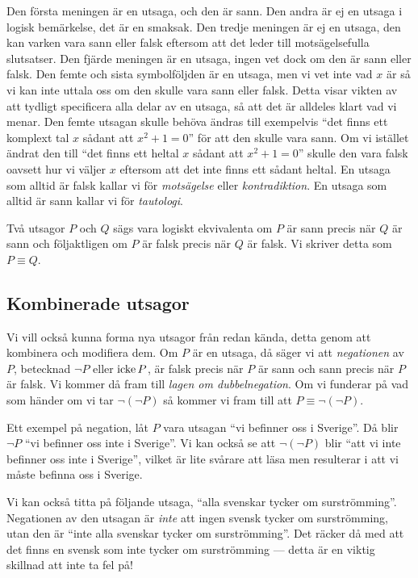 Den första meningen är en utsaga, och den är sann.
Den andra är ej en utsaga i logisk bemärkelse, det är en smaksak.
Den tredje meningen är ej en utsaga, den kan varken vara sann eller falsk
eftersom att det leder till motsägelsefulla slutsatser.
Den fjärde meningen är en utsaga, ingen vet dock om den är sann eller falsk.
Den femte och sista symbolföljden är en utsaga, men vi vet inte vad \(x\) är så
vi kan inte uttala oss om den skulle vara sann eller falsk.
Detta visar vikten av att tydligt specificera alla delar av en utsaga, så att
det är alldeles klart vad vi menar.
Den femte utsagan skulle behöva ändras till exempelvis \enquote{det finns ett
komplext tal \(x\) sådant att \(x^2+1=0\)} för att den skulle vara sann.
Om vi istället ändrat den till \enquote{det finns ett heltal \(x\) sådant att
\(x^2+1=0\)} skulle den vara falsk oavsett hur vi väljer \(x\) eftersom att
det inte finns ett sådant heltal.  En utsaga som alltid är falsk kallar vi för 
\emph{motsägelse} eller
\emph{kontradiktion}.
En utsaga som alltid är sann kallar vi för \emph{tautologi}.

Två utsagor \(P\) och \(Q\) sägs vara logiskt 
ekvivalenta om \(P\) är sann
precis när \(Q\) är sann och följaktligen om \(P\) är falsk precis när \(Q\)
är falsk.
Vi skriver detta som \(P\equiv Q\).

\subsection{Kombinerade utsagor}

Vi vill också kunna forma nya utsagor från redan kända, detta genom att
kombinera och modifiera dem.
Om \(P\) är en utsaga, då säger vi att \emph{negationen} 
av \(P\), betecknad \(\lnot P\) eller \(\operatorname{icke} P\), är falsk precis när \(P\) är 
sann och sann precis när \(P\) är falsk.
Vi kommer då fram till \emph{lagen om dubbelnegation}.
Om vi funderar på vad som händer om vi tar \(\lnot(\lnot P)\) så kommer vi
fram till att \(P\equiv \lnot(\lnot P)\).
\begin{example}
  Ett exempel på negation, låt \(P\) vara utsagan \enquote{vi befinner oss i
  Sverige}.
  Då blir \(\lnot P\) \enquote{vi befinner oss inte i Sverige}.
  Vi kan också se att \(\lnot(\lnot P)\) blir \enquote{att vi inte befinner oss 
  inte i Sverige}, vilket är lite svårare att läsa men resulterar i att vi 
  måste befinna oss i Sverige.
\end{example}
\begin{example}
  Vi kan också titta på följande utsaga, \enquote{alla svenskar tycker om
  surströmming}.
  Negationen av den utsagan är \emph{inte} att ingen svensk tycker om
  surströmming, utan den är \enquote{inte alla svenskar tycker om 
  surströmming}.
  Det räcker då med att det finns en svensk som inte tycker om
  surströmming --- detta är en viktig skillnad att inte ta fel på!
\end{example}

